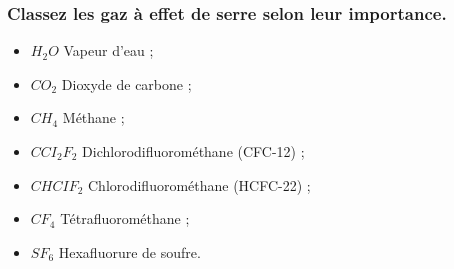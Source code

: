 \subsubsection{Classez les gaz à effet de serre selon leur importance.}
\color{cyan}
\begin{itemize}
	\item \textbf{$H_2O$} Vapeur d'eau ;
	\item \textbf{$CO_2$} Dioxyde de carbone ;
	\item \textbf{$CH_4$} Méthane ;
	\item \textbf{$CCI_2F_2$} Dichlorodifluorométhane (CFC-12) ;
	\item \textbf{$CHCIF_2$} Chlorodifluorométhane (HCFC-22) ;
	\item \textbf{$CF_4$} Tétrafluorométhane ;
	\item \textbf{$SF_6$} Hexafluorure de soufre.
\end{itemize}
\color{black}




